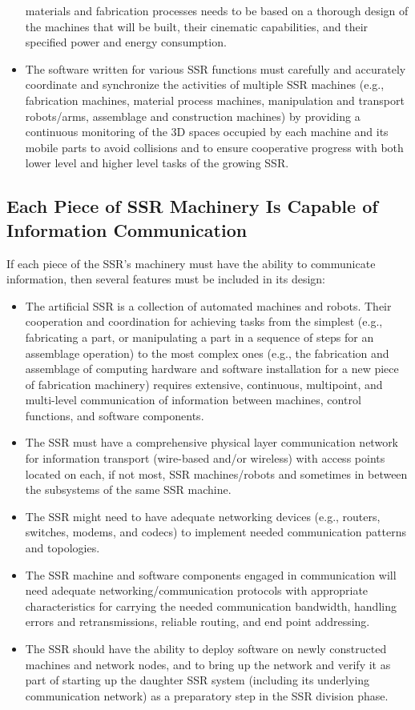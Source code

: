 \begin{itemize}
materials and fabrication processes needs to be based on a thorough
design of the machines that will be built, their cinematic capabilities, and
their specified power and energy consumption.
\item The software written for various SSR functions must carefully and
accurately coordinate and synchronize the activities of
multiple SSR machines (e.g., fabrication machines, material process machines,
manipulation and transport \mbox{robots/arms}, assemblage and construction
machines) by providing a continuous monitoring of the 3D spaces occupied
by each machine and its mobile parts to avoid collisions and to ensure
cooperative progress with both lower level and higher level tasks of
the growing SSR.
\end{itemize}

\subsection[Each Piece of SSR Machinery Is Capable of Information Communication]{Each Piece of SSR Machinery Is Capable of Information Communication}

If each piece of the SSR's machinery must have the ability to communicate information, then several features must be included in its design:

\begin{itemize}
\item The artificial SSR is a collection of automated machines and
robots. Their cooperation and coordination for achieving tasks from the
simplest (e.g., fabricating a part, or manipulating a part in a sequence of
steps for an assemblage operation) to the most complex ones (e.g., the
fabrication and assemblage of computing hardware and software
installation for a new piece of fabrication machinery) requires extensive,
continuous, multipoint, and multi-level communication of
information between machines, control functions, and software
components.
\item The SSR must have a comprehensive physical layer communication
network for information transport (wire-based and/or wireless)
with access points located on each, if not most, SSR machines/robots and
sometimes in between the subsystems of the same SSR machine.
\item The SSR might need to have adequate networking devices (e.g.,
routers, switches, modems, and codecs) to implement needed communication
patterns and topologies.
\item The SSR machine and software components engaged in communication
will need adequate networking/communication protocols with appropriate
characteristics for carrying the needed communication bandwidth, handling 
errors and retransmissions, reliable routing, and end point addressing.
\item The SSR should have the ability to deploy software on newly
constructed machines and network nodes, and to bring up the
network and verify it as part of starting up the daughter SSR system
(including its underlying communication network) as a preparatory step
in the SSR division phase.
\end{itemize}

